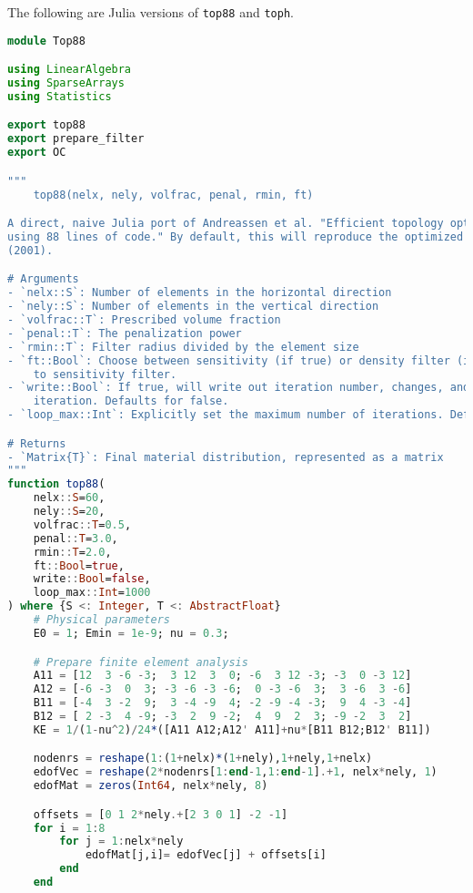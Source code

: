 The following are Julia versions of \texttt{top88} and \texttt{toph}.

\begin{lstlisting}[language=Julia, title=\texttt{top88.jl}]
module Top88

using LinearAlgebra
using SparseArrays
using Statistics

export top88
export prepare_filter
export OC

"""
    top88(nelx, nely, volfrac, penal, rmin, ft)

A direct, naive Julia port of Andreassen et al. "Efficient topology optimization in MATLAB
using 88 lines of code." By default, this will reproduce the optimized MBB beam from Sigmund
(2001).

# Arguments
- `nelx::S`: Number of elements in the horizontal direction
- `nely::S`: Number of elements in the vertical direction
- `volfrac::T`: Prescribed volume fraction
- `penal::T`: The penalization power
- `rmin::T`: Filter radius divided by the element size
- `ft::Bool`: Choose between sensitivity (if true) or density filter (if false). Defaults
    to sensitivity filter.
- `write::Bool`: If true, will write out iteration number, changes, and density for each
    iteration. Defaults for false.
- `loop_max::Int`: Explicitly set the maximum number of iterations. Defaults to 1000.

# Returns
- `Matrix{T}`: Final material distribution, represented as a matrix
"""
function top88(
    nelx::S=60,
    nely::S=20,
    volfrac::T=0.5,
    penal::T=3.0,
    rmin::T=2.0,
    ft::Bool=true,
    write::Bool=false,
    loop_max::Int=1000
) where {S <: Integer, T <: AbstractFloat}
    # Physical parameters
    E0 = 1; Emin = 1e-9; nu = 0.3;

    # Prepare finite element analysis
    A11 = [12  3 -6 -3;  3 12  3  0; -6  3 12 -3; -3  0 -3 12]
    A12 = [-6 -3  0  3; -3 -6 -3 -6;  0 -3 -6  3;  3 -6  3 -6]
    B11 = [-4  3 -2  9;  3 -4 -9  4; -2 -9 -4 -3;  9  4 -3 -4]
    B12 = [ 2 -3  4 -9; -3  2  9 -2;  4  9  2  3; -9 -2  3  2]
    KE = 1/(1-nu^2)/24*([A11 A12;A12' A11]+nu*[B11 B12;B12' B11])

    nodenrs = reshape(1:(1+nelx)*(1+nely),1+nely,1+nelx)
    edofVec = reshape(2*nodenrs[1:end-1,1:end-1].+1, nelx*nely, 1)
    edofMat = zeros(Int64, nelx*nely, 8)

    offsets = [0 1 2*nely.+[2 3 0 1] -2 -1]
    for i = 1:8
        for j = 1:nelx*nely
            edofMat[j,i]= edofVec[j] + offsets[i]
        end
    end


\end{lstlisting}
